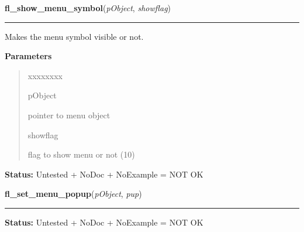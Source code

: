 \hspace{.8\funcindent}\begin{boxedminipage}{\funcwidth}

    \raggedright \textbf{fl\_show\_menu\_symbol}(\textit{pObject}, \textit{showflag})

    \vspace{-1.5ex}

    \rule{\textwidth}{0.5\fboxrule}
\setlength{\parskip}{2ex}
    Makes the menu symbol visible or not.

\setlength{\parskip}{1ex}
      \textbf{Parameters}
      \vspace{-1ex}

      \begin{quote}
        \begin{Ventry}{xxxxxxxx}

          \item[pObject]

          pointer to menu object

          \item[showflag]

          flag to show menu or not (1{\textbar}0)

        \end{Ventry}

      \end{quote}

\textbf{Status:} Untested + NoDoc + NoExample = NOT OK



    \end{boxedminipage}

    \label{xformslib:library:fl_set_menu_popup}

    \vspace{0.5ex}

\hspace{.8\funcindent}\begin{boxedminipage}{\funcwidth}

    \raggedright \textbf{fl\_set\_menu\_popup}(\textit{pObject}, \textit{pup})

    \vspace{-1.5ex}

    \rule{\textwidth}{0.5\fboxrule}
\setlength{\parskip}{2ex}
\setlength{\parskip}{1ex}
\textbf{Status:} Untested + NoDoc + NoExample = NOT OK



    \end{boxedminipage}

